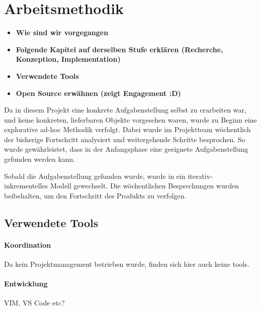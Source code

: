 \section{Arbeitsmethodik}
\label{sec:Arbeitsmethodik}
\begin{itemize}
    \item \textbf{Wie sind wir vorgegangen}
    \item \textbf{Folgende Kapitel auf derselben Stufe erklären (Recherche, Konzeption, Implementation)}
    \item \textbf{Verwendete Tools}
    \item \textbf{Open Source erwähnen (zeigt Engagement :D)}
\end{itemize}
Da in diesem Projekt eine konkrete Aufgabenstellung selbst zu erarbeiten war, und keine konkreten, lieferbaren Objekte vorgesehen waren, wurde zu Beginn eine explorative ad-hoc Methodik verfolgt. Dabei wurde im Projektteam wöchentlich der bisherige Fortschritt analysiert und weitergehende Schritte besprochen. So wurde gewährleistet, dass in der Anfangsphase eine geeignete Aufgabenstellung gefunden werden kann.
\par
Sobald die Aufgabenstellung gefunden wurde, wurde in ein iterativ- inkrementelles Modell gewechselt. Die wöchentlichen Besprechungen wurden beibehalten, um den Fortschritt des Produkts zu verfolgen.

\subsection{Verwendete Tools}
\paragraph{Koordination}
Da kein Projektmanagement betrieben wurde, finden sich hier auch keine tools.

\paragraph{Entwicklung}
VIM, VS Code etc?